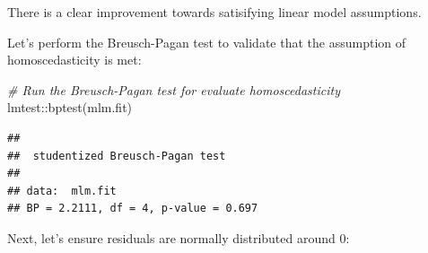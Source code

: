 \documentclass[
]{book}
\newenvironment{Shaded}{\begin{snugshade}}{\end{snugshade}}
\newcommand{\AttributeTok}[1]{\textcolor[rgb]{0.77,0.63,0.00}{#1}}
\newcommand{\CommentTok}[1]{\textcolor[rgb]{0.56,0.35,0.01}{\textit{#1}}}
\newcommand{\FloatTok}[1]{\textcolor[rgb]{0.00,0.00,0.81}{#1}}
\newcommand{\FunctionTok}[1]{\textcolor[rgb]{0.00,0.00,0.00}{#1}}
\newcommand{\NormalTok}[1]{#1}
\newcommand{\SpecialCharTok}[1]{\textcolor[rgb]{0.00,0.00,0.00}{#1}}
\newcommand{\StringTok}[1]{\textcolor[rgb]{0.31,0.60,0.02}{#1}}
\begin{document}
There is a clear improvement towards satisifying linear model assumptions.

Let's perform the Breusch-Pagan test to validate that the assumption of homoscedasticity is met:

\begin{Shaded}
\begin{Highlighting}[]
\CommentTok{\# Run the Breusch{-}Pagan test for evaluate homoscedasticity}
\NormalTok{lmtest}\SpecialCharTok{::}\FunctionTok{bptest}\NormalTok{(mlm.fit)}
\end{Highlighting}
\end{Shaded}

\begin{verbatim}
## 
##  studentized Breusch-Pagan test
## 
## data:  mlm.fit
## BP = 2.2111, df = 4, p-value = 0.697
\end{verbatim}

Next, let's ensure residuals are normally distributed around 0:

\begin{Shaded}
\end{Shaded}
\end{document}
